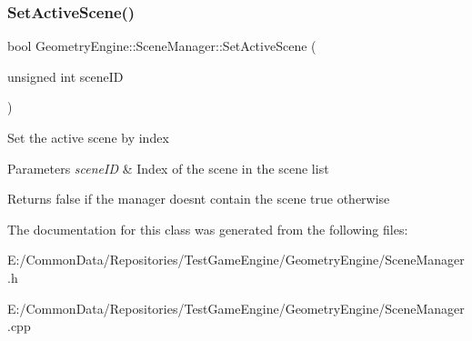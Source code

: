\subsubsection{\texorpdfstring{SetActiveScene()}{SetActiveScene()}\hspace{0.1cm}{\footnotesize\ttfamily [2/2]}}
{\footnotesize\ttfamily bool Geometry\+Engine\+::\+Scene\+Manager\+::\+Set\+Active\+Scene (\begin{DoxyParamCaption}\item[{unsigned int}]{scene\+ID }\end{DoxyParamCaption})}

Set the active scene by index 
\begin{DoxyParams}{Parameters}
{\em scene\+ID} & Index of the scene in the scene list \\
\hline
\end{DoxyParams}
\begin{DoxyReturn}{Returns}
false if the manager doesn\textquotesingle{}t contain the scene true otherwise 
\end{DoxyReturn}


The documentation for this class was generated from the following files\+:\begin{DoxyCompactItemize}
\item 
E\+:/\+Common\+Data/\+Repositories/\+Test\+Game\+Engine/\+Geometry\+Engine/Scene\+Manager.\+h\item 
E\+:/\+Common\+Data/\+Repositories/\+Test\+Game\+Engine/\+Geometry\+Engine/Scene\+Manager.\+cpp\end{DoxyCompactItemize}
